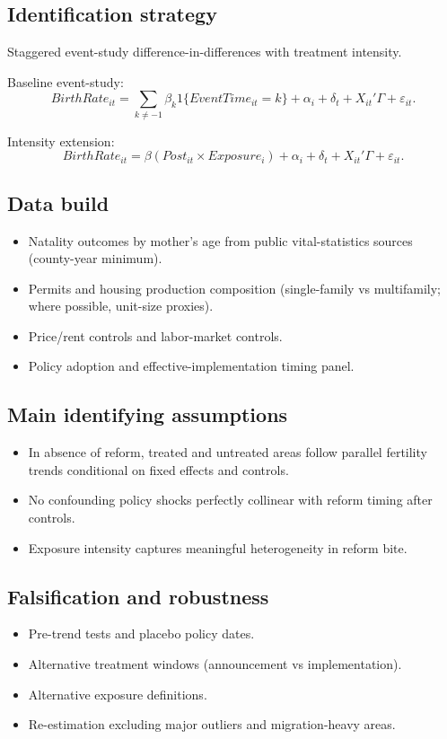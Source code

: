 \documentclass[11pt]{article}
\begin{document}
\subsection*{Identification strategy}
Staggered event-study difference-in-differences with treatment intensity.

Baseline event-study:
\[
BirthRate_{it} = \sum_{k\neq -1}\beta_k 1\{EventTime_{it}=k\}+\alpha_i+\delta_t+X_{it}'\Gamma+\varepsilon_{it}.
\]

Intensity extension:
\[
BirthRate_{it}=\beta(Post_{it}\times Exposure_i)+\alpha_i+\delta_t+X_{it}'\Gamma+\varepsilon_{it}.
\]

\subsection*{Data build}
\begin{itemize}
\item Natality outcomes by mother's age from public vital-statistics sources (county-year minimum).
\item Permits and housing production composition (single-family vs multifamily; where possible, unit-size proxies).
\item Price/rent controls and labor-market controls.
\item Policy adoption and effective-implementation timing panel.
\end{itemize}

\subsection*{Main identifying assumptions}
\begin{itemize}
\item In absence of reform, treated and untreated areas follow parallel fertility trends conditional on fixed effects and controls.
\item No confounding policy shocks perfectly collinear with reform timing after controls.
\item Exposure intensity captures meaningful heterogeneity in reform bite.
\end{itemize}

\subsection*{Falsification and robustness}
\begin{itemize}
\item Pre-trend tests and placebo policy dates.
\item Alternative treatment windows (announcement vs implementation).
\item Alternative exposure definitions.
\item Re-estimation excluding major outliers and migration-heavy areas.
\end{itemize}
\end{document}
